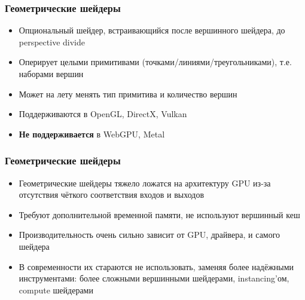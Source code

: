 \documentclass[10pt]{beamer}
\begin{document}
\begin{frame}[fragile]
\frametitle{Геометрические шейдеры}
\begin{itemize}
\item Опциональный шейдер, встраивающийся после вершинного шейдера, до perspective divide
\pause
\item Оперирует целыми примитивами (точками/линиями/треугольниками), т.е. наборами вершин
\pause
\item Может на лету менять тип примитива и количество вершин
\pause
\item Поддерживаются в OpenGL, DirectX, Vulkan
\pause
\item \textbf{Не поддерживается} в WebGPU, Metal
\end{itemize}
\end{frame}

\begin{frame}[fragile]
\frametitle{Геометрические шейдеры}
\begin{itemize}
\item Геометрические шейдеры тяжело ложатся на архитектуру GPU из-за отсутствия чёткого соответствия входов и выходов
\pause
\item Требуют дополнительной временной памяти, не используют вершинный кеш
\pause
\item Производительность очень сильно зависит от GPU, драйвера, и самого шейдера
\pause
\item В современности их стараются не использовать, заменяя более надёжными инструментами: более сложными вершинными шейдерами, instancing'ом, compute шейдерами
\end{itemize}
\end{frame}
\end{document}
